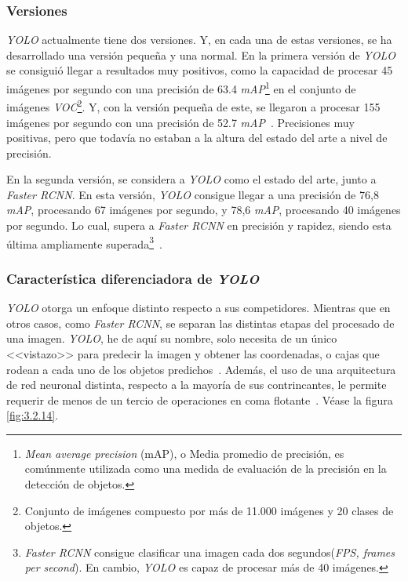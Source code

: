 \subsubsection{Versiones}

\textit{YOLO} actualmente tiene dos versiones. Y, en cada una de estas versiones, se ha desarrollado una versión pequeña y una normal. En la primera versión de \textit{YOLO} se consiguió llegar a resultados muy positivos, como la capacidad de procesar 45 imágenes por segundo con una precisión de 63.4 \textit{mAP}\footnote{\textit{Mean average precision} (mAP), o Media promedio de precisión, es comúnmente utilizada como una medida de evaluación de la precisión en la detección de objetos.} en el conjunto de imágenes \textit{VOC}\footnote{Conjunto de imágenes compuesto por más de 11.000 imágenes y 20 clases de objetos.}. Y, con la versión pequeña de este, se llegaron a procesar 155 imágenes por segundo con una precisión de 52.7 \textit{mAP}~\cite{yolo}. Precisiones muy positivas, pero que todavía no estaban a la altura del estado del arte a nivel de precisión.

En la segunda versión, se considera a \textit{YOLO} como el estado del arte, junto a \textit{Faster RCNN}. En esta versión, \textit{YOLO} consigue llegar a una precisión de 76,8 \textit{mAP}, procesando 67 imágenes por segundo, y 78,6 \textit{mAP}, procesando 40 imágenes por segundo. Lo cual, supera a \textit{Faster RCNN} en precisión y rapidez, siendo esta última ampliamente superada\footnote{\textit{Faster RCNN} consigue clasificar una imagen cada dos segundos(\textit{FPS, frames per second}). En cambio, \textit{YOLO} es capaz de procesar más de 40 imágenes.}~\cite{yolov2}.

\subsubsection{Característica diferenciadora de \textit{YOLO}}

\textit{YOLO} otorga un enfoque distinto respecto a sus competidores. Mientras que en otros casos, como \textit{Faster RCNN}, se separan las distintas etapas del procesado de una imagen. \textit{YOLO}, he de aquí su nombre, solo necesita de un único <<vistazo>> para predecir la imagen y obtener las coordenadas, o cajas que rodean a cada uno de los objetos predichos~\cite{yolo}. Además, el uso de una arquitectura de red neuronal distinta, respecto a la mayoría de sus contrincantes, le permite requerir de menos de un tercio de operaciones en coma flotante~\cite{yolov2}. Véase la figura \ref{fig:3.2.14}.

